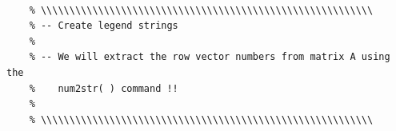 \documentclass{article}
\begin{document}
\begin{verbatim}
    
    % \\\\\\\\\\\\\\\\\\\\\\\\\\\\\\\\\\\\\\\\\\\\\\\\\\\\\\\\\\
    % -- Create legend strings
    %
    % -- We will extract the row vector numbers from matrix A using the
    %    num2str( ) command !!
    %
    % \\\\\\\\\\\\\\\\\\\\\\\\\\\\\\\\\\\\\\\\\\\\\\\\\\\\\\\\\\
    

\end{verbatim}
\end{document}
